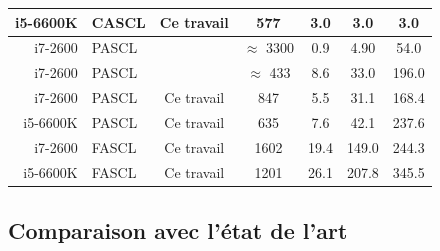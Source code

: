\begin{table}[ht]
{{\begin{tabular}{r|l|c|c|c c c}
        i5-6600K & CASCL & Ce travail                       & 577                            & 3.0             & 3.0             & 3.0             \\
        \hline
        i7-2600  & PASCL &~\cite{sarkis_increasing_2014}    & $\approx$ 3300                 & 0.9             & 4.90            & 54.0            \\
        i7-2600  & PASCL &~\cite{sarkis_fast_2016}          & $\approx$ 433                  & 8.6             & 33.0            & 196.0           \\
        i7-2600  & PASCL & Ce travail                       & 847                            & 5.5             & 31.1            & 168.4           \\
        i5-6600K & PASCL & Ce travail                       & 635                            & 7.6             & 42.1            & 237.6           \\
        \hline
        i7-2600  & FASCL & Ce travail                       & 1602                           & 19.4            & 149.0           & 244.3           \\
        i5-6600K & FASCL & Ce travail                       & 1201                           & 26.1            & 207.8           & 345.5           \\
      \end{tabular}
      }}
      \parnotes
    \end{table}

\subsection{Comparaison avec l'état de l'art}

